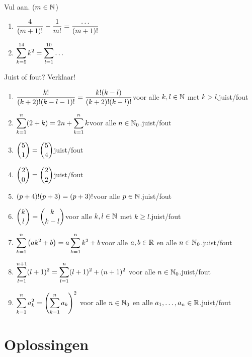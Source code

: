 \documentclass{ximera}
\begin{document}
\begin{oefening2}Vul aan. ($m\in\mathbb{N}$)
\begin{enumerate}
\item $\displaystyle{\frac{4}{(m+1)!}-\frac{1}{m!}=\frac{\ldots}{(m+1)!}}$
\item $\displaystyle{\sum^{14}_{k=5}k^2=\sum^{10}_{l=1}\ldots}$
\end{enumerate}
\end{oefening2}

\begin{oefening2}Juist of fout? Verklaar!
\begin{enumerate}
\item $\displaystyle{\frac{k!}{(k+2)!(k-l-1)!}=\frac{k!(k-l)}{(k+2)!(k-l)!}}$\quad voor alle $k,l\in\mathbb{N}$ met $k>l$.\hfill juist/fout
\item $\displaystyle{\sum^{n}_{k=1}(2+k)=2n+\sum^{n}_{k=1}k}$\quad voor alle $n\in\mathbb{N}_0$.\hfill juist/fout
\item $\displaystyle{{5\choose1}={5\choose4}}$\hfill juist/fout
\item $\displaystyle{{2\choose0}={2\choose2}}$\hfill juist/fout
\item $\displaystyle{(p+4)!(p+3)=(p+3)!}$\quad voor alle $p\in\mathbb{N}$.\hfill juist/fout
\item $\displaystyle{{k\choose l}={k\choose{k-l}}}$\quad voor alle $k,l\in\mathbb{N}$ met $k\geqslant l$.\hfill juist/fout
\item $\displaystyle{\sum^{n}_{k=1}\left(ak^2+b\right)=a\sum^{n}_{k=1}k^{2}+b}$\quad voor alle $a,b\in\mathbb{R}$ en alle $n\in\mathbb{N}_0$.\hfill juist/fout
\item $\displaystyle{\sum^{n+1}_{l=1}(l+1)^{2}=\sum^{n}_{l=1}(l+1)^{2}+(n+1)^{2}}$ \quad voor alle $n\in\mathbb{N}_0$.\hfill juist/fout
\item $\displaystyle{\sum^{n}_{k=1}a_k^{2}=\left(\sum^{n}_{k=1}a_k\right)^{2}}$ \quad voor alle $n\in\mathbb{N}_0$ en alle $a_1,\ldots,a_n\in\mathbb{R}$.\hfill juist/fout
\end{enumerate}
\end{oefening2}


\section{Oplossingen}
\setlength{\parskip}{0pt}


\clearpage{\pagestyle{empty}\cleardoublepage}
\end{document}
